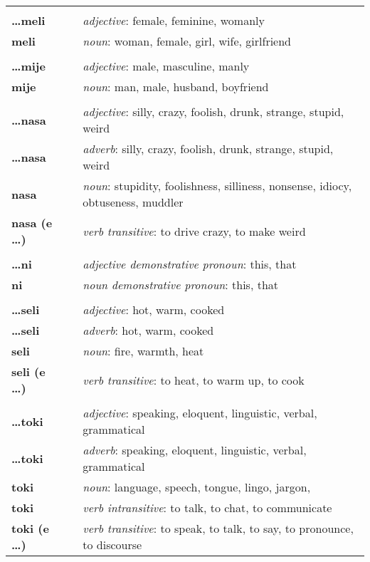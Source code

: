\begin{supertabular}{p{2,5cm}|ll}
 && \\ %
%
\textbf{\dots meli} && \textit{adjective}: female, feminine, womanly \\ %
\textbf{meli} && \textit{noun}: woman, female, girl, wife, girlfriend \\ %
 && \\ %
%
\textbf{\dots mije} && \textit{adjective}: male, masculine, manly \\ %
\textbf{mije} && \textit{noun}: man, male, husband, boyfriend \\ %
 && \\ %
%
\textbf{\dots nasa} && \textit{adjective}: silly, crazy, foolish, drunk, strange, stupid, weird \\ %
\textbf{\dots nasa} && \textit{adverb}: silly, crazy, foolish, drunk, strange, stupid, weird \\ %
\textbf{nasa} && \textit{noun}: stupidity, foolishness, silliness, nonsense, idiocy, obtuseness, muddler \\ %
\textbf{nasa (e \dots)} && \textit{verb transitive}: to drive crazy, to make weird \\ %
 && \\ %
%
\textbf{\dots ni} && \textit{adjective demonstrative pronoun}: this, that \\ %
\textbf{ni} && \textit{noun demonstrative pronoun}: this, that \\ %
 && \\ %
%
\textbf{\dots seli} && \textit{adjective}: hot, warm, cooked \\ %
\textbf{\dots seli} && \textit{adverb}: hot, warm, cooked \\ %
\textbf{seli} && \textit{noun}: fire, warmth, heat \\ %
\textbf{seli (e \dots)} && \textit{verb transitive}: to heat, to warm up, to cook \\ %
 && \\ %
%
\textbf{\dots toki} && \textit{adjective}: speaking, eloquent, linguistic, verbal, grammatical \\ %
\textbf{\dots toki} && \textit{adverb}: speaking, eloquent, linguistic, verbal, grammatical \\ %
\textbf{toki} && \textit{noun}: language, speech, tongue, lingo, jargon, \\ %
\textbf{toki} && \textit{verb intransitive}: to talk, to chat, to communicate \\ %
\textbf{toki (e \dots)} && \textit{verb transitive}: to speak, to talk, to say, to pronounce, to discourse \\ %
\end{supertabular} \\
% 
\newpage
%
